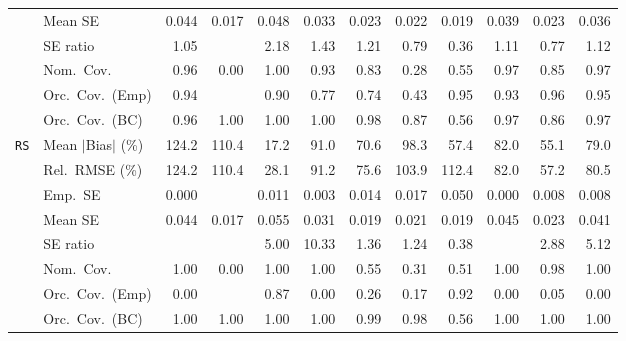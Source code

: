 \begin{landscape}
\begin{longtable}{llrrrrrrrrrr}
 & Mean SE & 0.044 & 0.017 & 0.048 & 0.033 & 0.023 & 0.022 & 0.019 & 0.039 & 0.023 & 0.036 \\
 & SE ratio & \cellcolor{rankone}1.05 &  & 2.18 & 1.43 & 1.21 & 0.79 & 0.36 & \cellcolor{ranktwo}1.11 & 0.77 & \cellcolor{rankthree}1.12 \\
 & Nom.\ Cov. & \cellcolor{rankone}0.96 & 0.00 & \cellcolor{rankthree}1.00 & \cellcolor{ranktwo}0.93 & 0.83 & 0.28 & 0.55 & \cellcolor{ranktwo}0.97 & 0.85 & \cellcolor{ranktwo}0.97 \\
 & Orc.\ Cov.\ (Emp) & \cellcolor{ranktwo}0.94 &  & 0.90 & 0.77 & 0.74 & 0.43 & \cellcolor{rankone}0.95 & \cellcolor{rankthree}0.93 & \cellcolor{ranktwo}0.96 & \cellcolor{rankone}0.95 \\
 & Orc.\ Cov.\ (BC) & \cellcolor{rankone}0.96 & 1.00 & 1.00 & 1.00 & \cellcolor{rankthree}0.98 & 0.87 & 0.56 & \cellcolor{ranktwo}0.97 & 0.86 & \cellcolor{ranktwo}0.97 \\
\addlinespace[2pt]
\quad \texttt{RS} & Mean $|$Bias$|$ (\%) & 124.2 & 110.4 & \cellcolor{rankone}17.2 & 91.0 & 70.6 & 98.3 & \cellcolor{rankthree}57.4 & 82.0 & \cellcolor{ranktwo}55.1 & 79.0 \\
 & Rel.\ RMSE (\%) & 124.2 & 110.4 & \cellcolor{rankone}28.1 & 91.2 & \cellcolor{rankthree}75.6 & 103.9 & 112.4 & 82.0 & \cellcolor{ranktwo}57.2 & 80.5 \\
 & Emp.\ SE & 0.000 &  & 0.011 & 0.003 & 0.014 & 0.017 & 0.050 & 0.000 & 0.008 & 0.008 \\
 & Mean SE & 0.044 & 0.017 & 0.055 & 0.031 & 0.019 & 0.021 & 0.019 & 0.045 & 0.023 & 0.041 \\
 & SE ratio &  &  & 5.00 & 10.33 & \cellcolor{ranktwo}1.36 & \cellcolor{rankone}1.24 & \cellcolor{rankthree}0.38 &  & 2.88 & 5.12 \\
 & Nom.\ Cov. & \cellcolor{ranktwo}1.00 & 0.00 & \cellcolor{ranktwo}1.00 & \cellcolor{ranktwo}1.00 & \cellcolor{rankthree}0.55 & 0.31 & 0.51 & \cellcolor{ranktwo}1.00 & \cellcolor{rankone}0.98 & \cellcolor{ranktwo}1.00 \\
 & Orc.\ Cov.\ (Emp) & 0.00 &  & \cellcolor{ranktwo}0.87 & 0.00 & \cellcolor{rankthree}0.26 & 0.17 & \cellcolor{rankone}0.92 & 0.00 & 0.05 & 0.00 \\
 & Orc.\ Cov.\ (BC) & \cellcolor{rankthree}1.00 & \cellcolor{rankthree}1.00 & \cellcolor{rankthree}1.00 & \cellcolor{rankthree}1.00 & \cellcolor{ranktwo}0.99 & \cellcolor{rankone}0.98 & 0.56 & \cellcolor{rankthree}1.00 & \cellcolor{rankthree}1.00 & \cellcolor{rankthree}1.00 \\

\end{longtable}
\end{landscape}

